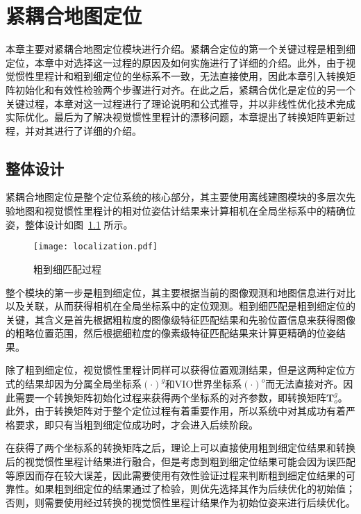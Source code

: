 
\chapter{紧耦合地图定位}

本章主要对紧耦合地图定位模块进行介绍。紧耦合定位的第一个关键过程是粗到细定位，本章中对选择这一过程的原因及如何实施进行了详细的介绍。此外，由于视觉惯性里程计和粗到细定位的坐标系不一致，无法直接使用，因此本章引入转换矩阵初始化和有效性检验两个步骤进行对齐。在此之后，紧耦合优化是定位的另一个关键过程，本章对这一过程进行了理论说明和公式推导，并以非线性优化技术完成实际优化。最后为了解决视觉惯性里程计的漂移问题，本章提出了转换矩阵更新过程，并对其进行了详细的介绍。

\section{整体设计}

紧耦合地图定位是整个定位系统的核心部分，其主要使用离线建图模块的多层次先验地图和视觉惯性里程计的相对位姿估计结果来计算相机在全局坐标系中的精确位姿，整体设计如图~\ref{fig:localization} 所示。

\begin{figure}
  \centering
  \texttt{[image: localization.pdf]}
  \caption{粗到细匹配过程}
  \label{fig:localization}
\end{figure}

整个模块的第一步是粗到细定位，其主要根据当前的图像观测和地图信息进行对比以及关联，从而获得相机在全局坐标系中的定位观测。粗到细匹配是粗到细定位的关键，其含义是首先根据粗粒度的图像级特征匹配结果和先验位置信息来获得图像的粗略位置范围，然后根据细粒度的像素级特征匹配结果来计算更精确的位姿结果。

除了粗到细定位，视觉惯性里程计同样可以获得位置观测结果，但是这两种定位方式的结果却因为分属全局坐标系$(\cdot)^{g}$和VIO世界坐标系$(\cdot)^{o}$而无法直接对齐。因此需要一个转换矩阵初始化过程来获得两个坐标系的对齐参数，即转换矩阵$\symbf{T}_o^{g}$。此外，由于转换矩阵对于整个定位过程有着重要作用，所以系统中对其成功有着严格要求，即只有当粗到细定位成功时，才会进入后续阶段。

在获得了两个坐标系的转换矩阵之后，理论上可以直接使用粗到细定位结果和转换后的视觉惯性里程计结果进行融合，但是考虑到粗到细定位结果可能会因为误匹配等原因而存在较大误差，因此需要使用有效性验证过程来判断粗到细定位结果的可靠性。如果粗到细定位的结果通过了检验，则优先选择其作为后续优化的初始值；否则，则需要使用经过转换的视觉惯性里程计结果作为初始位姿来进行后续优化。

